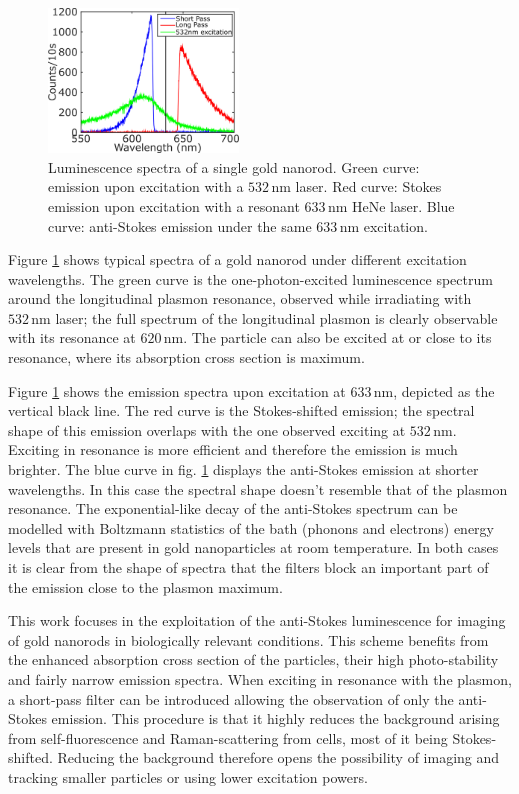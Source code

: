 \documentclass[journal=nalefd,manuscript=letter]{achemso}
\newcommand{\nm}{\ensuremath{\,\textrm{nm}}}
\begin{document}
\begin{figure}[htp] \centering
\includegraphics[width=0.45\textwidth]{Figures/01_3_Curves/3_curves_final.png}
\caption{Luminescence spectra of a single gold nanorod. Green curve: emission
upon excitation with a $532\nm$ laser. Red curve: Stokes emission upon
excitation with a resonant $633\nm$ HeNe laser. Blue curve: anti-Stokes emission
under the same $633\nm$ excitation.}
	\label{fig:spectra_rod}
\end{figure}

Figure \ref{fig:spectra_rod} shows typical spectra of a gold nanorod under
different excitation wavelengths. The green curve is the one-photon-excited
luminescence spectrum around the longitudinal plasmon resonance, observed while
irradiating with $532\nm$ laser; the full spectrum of the longitudinal plasmon
is clearly observable with its resonance at $620\nm$. The particle can also be
excited at or close to its resonance, where its absorption cross section is
maximum. 

Figure \ref{fig:spectra_rod} shows the emission spectra upon excitation at
$633\nm$, depicted as the vertical black line. The red curve is the
Stokes-shifted emission; the spectral shape of this emission overlaps with the
one observed exciting at $532\nm$. Exciting in resonance is more efficient and
therefore the emission is much brighter. The blue curve in fig.
\ref{fig:spectra_rod} displays the anti-Stokes emission at shorter wavelengths.
In this case the spectral shape doesn't resemble that of the plasmon resonance.
The exponential-like decay of the anti-Stokes spectrum can be modelled with
Boltzmann statistics\cite{He2015} of the bath (phonons and electrons) energy
levels that are present in gold nanoparticles at room temperature. In both cases
it is clear from the shape of spectra that the filters block an important part of the
emission close to the plasmon maximum.
 
This work focuses in the exploitation of the anti-Stokes
luminescence\cite{Jiang2013} for imaging of gold nanorods in biologically
relevant conditions. This scheme benefits from the enhanced absorption cross
section of the particles, their high photo-stability and fairly narrow emission
spectra. When exciting in resonance with the plasmon, a short-pass filter can be
introduced allowing the observation of only the anti-Stokes emission. This
procedure is that it highly reduces the background arising from
self-fluorescence and Raman-scattering from cells, most of it being
Stokes-shifted. Reducing the background therefore opens the possibility of
imaging and tracking smaller particles or using lower excitation powers.
\end{document}
